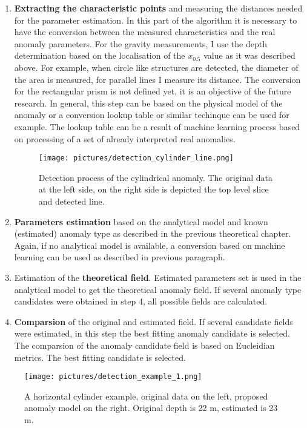 \documentclass[FM]{tulthesis}
\begin{document}
\begin{enumerate}
\item \textbf{Extracting the characteristic points} and measuring the distances needed for the parameter estimation. In this part of the algorithm it is necessary to have the conversion between the measured characteristics and the real anomaly parameters. For the gravity measurements, I use the depth determination based on the localisation of the $x_{0.5}$ value as it was described above. For example, when circle like structures are detected, the diameter of the area is measured, for parallel lines I measure its distance. The conversion for the rectangular prism is not defined yet, it is an objective of the future research. In general, this step can be based on the physical model of the anomaly or a conversion lookup table or similar techinque can be used for example. The lookup table can be a result of machine learning process based on processing of a set of already interpreted real anomalies. 

\begin{figure}[ht]
\renewcommand{\figurename}{Figure}
\centerline{\texttt{[image: pictures/detection\_cylinder\_line.png]}}
\caption[Gravimetry - detection of horizontal cylinder, step 1]{Detection process of the cylindrical anomaly. The original data at the left side, on the right side is depicted the top level slice and detected line.}
\label{fig:DetectionHC2}
\end{figure}

\item \textbf{Parameters estimation} based on the analytical model and known (estimated) anomaly type as described in the previous theoretical chapter. Again, if no analytical model is available, a conversion based on machine learning can be used as described in previous paragraph.
\item Estimation of the \textbf{theoretical field}. Estimated parameters set is used in the analytical model to get the theoretical anomaly field. If several anomaly type candidates were obtained in step 4, all possible fields are calculated.
\item \textbf{Comparsion} of the original and estimated field. If several candidate fields were estimated, in this step the best fitting anomaly candidate is selected. The comparsion of the anomaly candidate field is based on Eucleidian metrics. The best fitting candidate is selected.
\end{enumerate}

\begin{figure}[ht]
\renewcommand{\figurename}{Figure}
\centerline{\texttt{[image: pictures/detection\_example\_1.png]}}
\caption[Gravimetry - Example of detection]{A horizontal cylinder example, original data on the left, proposed anomaly model on the right. Original depth is 22 m, estimated is 23 m.}
\label{fig:DetectionHC3}
\end{figure}
\end{document}
